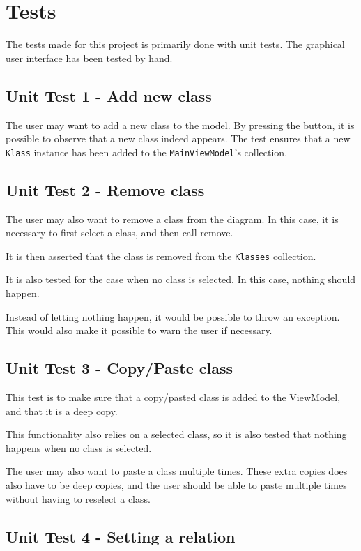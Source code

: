\section{Tests}

The tests made for this project is primarily done with unit
tests. The graphical user interface has been tested by hand.

\subsection{Unit Test 1 - Add new class}

The user may want to add a new class to the model. By pressing the button, it is
possible to observe that a new class indeed appears. The test ensures that a
new \texttt{Klass} instance has been added to the \texttt{MainViewModel}'s
collection.

\subsection{Unit Test 2 - Remove class}

The user may also want to remove a class from the diagram. In this case, it is
necessary to first select a class, and then call remove.

It is then asserted that the class is removed from the \texttt{Klasses}
collection.

It is also tested for the case when no class is selected. In this case, nothing
should happen.

Instead of letting nothing happen, it would be possible to throw an exception.
This would also make it possible to warn the user if necessary.

\subsection{Unit Test 3 - Copy/Paste class}

This test is to make sure that a copy/pasted class is added to the ViewModel,
and that it is a deep copy.

This functionality also relies on a selected class, so it is also tested that
nothing happens when no class is selected.

The user may also want to paste a class multiple times. These extra copies does
also have to be deep copies, and the user should be able to paste multiple times
without having to reselect a class.


\subsection{Unit Test 4 - Setting a relation}

